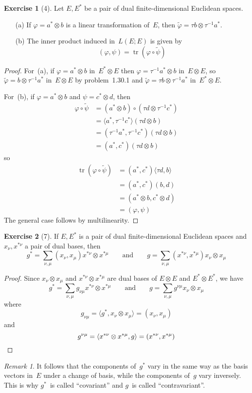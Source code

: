 \documentclass[letterpaper,12pt]{article}
\DeclareMathOperator{\tr}{tr}
\newcommand{\after}{\circ}
\newcommand{\tprod}{\otimes}
\newcommand{\sprod}[2]{\langle#1,#2\rangle}
\newcommand{\iprod}[2]{(#1,#2)}
\newcommand{\adj}[1]{\widetilde{#1}}
\theoremstyle{definition}
\newtheorem*{exer}{Exercise}
\theoremstyle{remark}
\newtheorem*{rmk}{Remark}
\begin{document}
\begin{exer}[4]
Let \(E,E^*\) be a pair of dual finite-dimensional Euclidean spaces.
\begin{enumerate}
\item[(a)] If \(\varphi=a^*\tprod b\) is a linear transformation of~\(E\), then \(\adj{\varphi}=\tau b\tprod\tau^{-1}a^*\).
\item[(b)] The inner product induced in~\(L(E;E)\) is given by
\[\iprod{\varphi}{\psi}=\tr(\varphi\after\adj{\psi})\]
\end{enumerate}
\end{exer}
\begin{proof}
For~(a), if \(\varphi=a^*\tprod b\) in~\(E^*\tprod E\) then \(\varphi=\tau^{-1}a^*\tprod b\) in~\(E\tprod E\), so \(\adj{\varphi}=b\tprod\tau^{-1}a^*\) in~\(E\tprod E\) by problem~1.30.1 and \(\adj{\varphi}=\tau b\tprod\tau^{-1}a^*\) in~\(E^*\tprod E\).

For~(b), if \(\varphi=a^*\tprod b\) and \(\psi=c^*\tprod d\), then
\begin{align*}
\varphi\after\adj{\psi}&=(a^*\tprod b)\after(\tau d\tprod\tau^{-1}c^*)\\
	&=\sprod{a^*}{\tau^{-1}c^*}(\tau d\tprod b)\\
	&=\iprod{\tau^{-1}a^*}{\tau^{-1}c^*}(\tau d\tprod b)\\
	&=\iprod{a^*}{c^*}(\tau d\tprod b)
\end{align*}
so
\begin{align*}
\tr(\varphi\after\adj{\psi})&=\iprod{a^*}{c^*}\sprod{\tau d}{b}\\
	&=\iprod{a^*}{c^*}\iprod{b}{d}\\
	&=\iprod{a^*\tprod b}{c^*\tprod d}\\
	&=\iprod{\varphi}{\psi}
\end{align*}
The general case follows by multilinearity.
\end{proof}

\begin{exer}[7]
If \(E,E^*\) is a pair of dual finite-dimensional Euclidean spaces and \(x_{\nu},x^{*\nu}\) a pair of dual bases, then
\[g^*=\sum_{\nu,\mu}\iprod{x_{\nu}}{x_{\mu}}x^{*\nu}\tprod x^{*\mu}\qquad\text{and}\qquad g=\sum_{\nu,\mu}\iprod{x^{*\nu}}{x^{*\mu}}x_{\nu}\tprod x_{\mu}\]
\end{exer}
\begin{proof}
Since \(x_{\nu}\tprod x_{\mu}\) and \(x^{*\nu}\tprod x^{*\mu}\) are dual bases of \(E\tprod E\) and \(E^*\tprod E^*\), we have
\[g^*=\sum_{\nu,\mu}g_{\nu\mu}x^{*\nu}\tprod x^{*\mu}\qquad\text{and}\qquad g=\sum_{\nu,\mu}g^{\nu\mu}x_{\nu}\tprod x_{\mu}\]
where
\[g_{\nu\mu}=\sprod{g^*}{x_{\nu}\tprod x_{\mu}}=\iprod{x_{\nu}}{x_{\mu}}\]
and
\[g^{\nu\mu}=\sprod{x^{*\nu}\tprod x^{*\mu}}{g}=\iprod{x^{*\nu}}{x^{*\mu}}\qedhere\]
\end{proof}
\begin{rmk}
It follows that the components of~\(g^*\) vary in the same way as the basis vectors in~\(E\) under a change of basis, while the components of~\(g\) vary inversely. This is why \(g^*\)~is called ``covariant'' and \(g\)~is called ``contravariant''.
\end{rmk}
\end{document}
